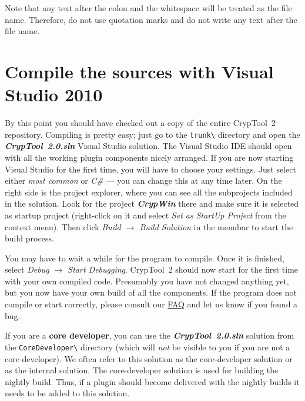 \begin{center}
\end{center}

Note that any text after the colon and the whitespace will be treated as the file name. Therefore, do not use quotation marks and do not write any text after the file name.

\section{Compile the sources with Visual Studio 2010}
\label{CompilingTheSourcesVS}

By this point you should have checked out a copy of the entire CrypTool~2 repository. Compiling is pretty easy; just go to the \texttt{trunk\textbackslash} directory and open the \textbf{\textit{CrypTool~2.0.sln}} Visual Studio solution. The Visual Studio IDE should open with all the working plugin components nicely arranged. If you are now starting Visual Studio for the first time, you will have to choose your settings. Just select either \textit{most common} or \textit{C\#} --- you can change this at any time later. On the right side is the project explorer, where you can see all the subprojects included in the solution. Look for the project \textbf{\textit{CrypWin}} there and make sure it is selected as startup project (right-click on it and select \textit{Set as StartUp Project} from the context menu). Then click \textit{Build $\rightarrow$ Build Solution} in the menubar to start the build process.

You may have to wait a while for the program to compile. Once it is finished, select \textit{Debug $\rightarrow$ Start Debugging}. CrypTool~2 should now start for the first time with your own compiled code. Presumably you have not changed anything yet, but you now have your own build of all the components. If the program does not compile or start correctly, please consult our \href{https://www.cryptool.org/trac/CrypTool2/wiki/FAQ}{FAQ} and let us know if you found a bug.

If you are a \textbf{core developer}, you can use the \textbf{\textit{CrypTool~2.0.sln}} solution from the \texttt{CoreDeveloper\textbackslash} directory (which will \textit{not} be visible to you if you are not a core developer). We often refer to this solution as the core-developer solution or as the internal solution. The core-developer solution is used for building the nightly build. Thus, if a plugin should become delivered with the nightly builds it needs to be added to this solution.

